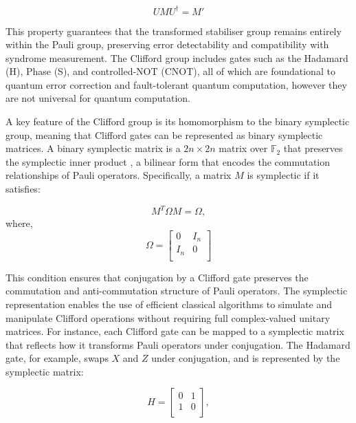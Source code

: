 \begin{equation}
    UMU^{\dagger}=M'
\end{equation}

This property guarantees that the transformed stabiliser group remains entirely within the Pauli group, preserving error detectability and compatibility with syndrome measurement. The Clifford group includes gates such as the Hadamard (H), Phase (S), and controlled-NOT (CNOT), all of which are foundational to quantum error correction and fault-tolerant quantum computation, however they are not universal for quantum computation.

A key feature of the Clifford group is its homomorphism to the binary symplectic group, meaning that Clifford gates can be represented as binary symplectic matrices. A binary symplectic matrix is a \(2n\times2n\) matrix over \(\mathbb{F}_2 \) that preserves the symplectic inner product \cite{rengaswamy2018synthesis}, a bilinear form that encodes the commutation relationships of Pauli operators. Specifically, a matrix \(M\) is symplectic if it satisfies:

\begin{equation}
\label{eq:symplectic matric property}
    M^T\Omega M=\Omega,
\end{equation}
where,
\begin{equation}
    \Omega = 
    \begin{bmatrix}
    0 & I_n \\
    I_n & 0 \\
    \end{bmatrix}
\end{equation}

This condition ensures that conjugation by a Clifford gate preserves the commutation and anti-commutation structure of Pauli operators. The symplectic representation enables the use of efficient classical algorithms to simulate and manipulate Clifford operations without requiring full complex-valued unitary matrices. For instance, each Clifford gate can be mapped to a symplectic matrix that reflects how it transforms Pauli operators under conjugation. The Hadamard gate, for example, swaps \(X\) and \(Z\) under conjugation, and is represented by the symplectic matrix:

\begin{equation}
H=
\begin{bmatrix}
    0 & 1 \\
    1 & 0 \\
\end{bmatrix}
,
\end{equation}

